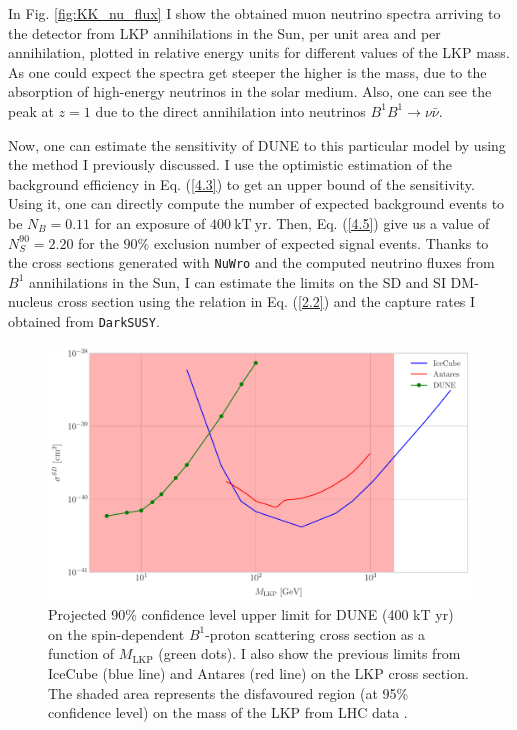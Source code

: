 In Fig. \ref{fig:KK_nu_flux} I show the obtained muon neutrino spectra arriving to the detector from LKP annihilations in the Sun, per unit area and per annihilation, plotted in relative energy units for different values of the LKP mass. As one could expect the spectra get steeper the higher is the mass, due to the absorption of high-energy neutrinos in the solar medium. Also, one can see  the peak at $z=1$ due to the direct annihilation into neutrinos $B^{1} B^{1} \rightarrow \nu \bar{\nu}$.

Now, one can estimate the sensitivity of DUNE to this particular model by using the method I previously discussed. I use the optimistic estimation of the background efficiency in Eq. (\ref{4.3}) to get an upper bound of the sensitivity. Using it, one can directly compute the number of expected background events to be $N_{B} = 0.11$ for an exposure of $400 \ \mathrm{kT}  \ \mathrm{yr}$. Then, Eq. (\ref{4.5}) give us a value of $N_{S}^{90} = 2.20$ for the $90\%$ exclusion number of expected signal events. Thanks to the cross sections generated with \texttt{NuWro} and the computed neutrino fluxes from $B^{1}$ annihilations in the Sun, I can estimate the limits on the SD and SI DM-nucleus cross section using the relation in Eq. (\ref{2.2}) and the capture rates I obtained from \texttt{DarkSUSY}.

\begin{figure}[t]
	\centering
	\includegraphics[width=0.9\linewidth]{Images/DM_Analysis/kk_xsection_sd_bounds}
	\caption[Projected 90\% confidence level upper limit for DUNE on the spin-dependent $B^{1}$-proton scattering cross section as a function of $M_{\mathrm{LKP}}$.]{Projected 90\% confidence level upper limit for DUNE (400 kT yr) on the spin-dependent $B^{1}$-proton scattering cross section as a function of $M_{\mathrm{LKP}}$ (green dots). I also show the previous limits from IceCube \cite{Bernadich2019} (blue line) and Antares \cite{Zornoza2012} (red line) on the LKP cross section. The shaded area represents the disfavoured region (at 95\% confidence level) on the mass of the LKP from LHC data \cite{Deutschmann2017}.}
	\label{fig:kk_xsection_sd_bounds}
\end{figure}

